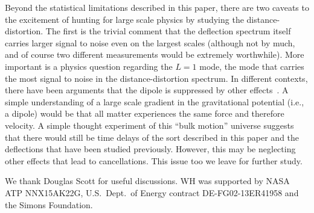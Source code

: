 \documentclass[prd,amsmath,amssymb,floatfix,superscriptaddress,nofootinbib,twocolumn]{revtex4-1}
\begin{document}
Beyond the statistical limitations described in this paper, there are two caveats to the excitement of hunting for large scale physics by studying the distance-distortion. The first is the trivial comment that the deflection spectrum itself carries larger signal to noise even on the largest scales (although not by much, and of course two different measurements would be extremely worthwhile). More important is a physics question regarding the $L=1$ mode, the mode that carries the most signal to noise in the distance-distortion spectrum. In different contexts, there have been arguments that the dipole is suppressed by other effects~\cite{Zibin:2008fe,Itoh:2009vc}. A simple understanding of a large scale gradient in the gravitational potential (i.e., a dipole) would be that all matter experiences the same force and therefore velocity. A simple thought experiment of this ``bulk motion'' universe suggests that there would still be time delays of the sort described in this paper and the deflections that have been studied previously. However, this may be neglecting other effects that lead to cancellations. This issue too we leave for further study.

\acknowledgements

We thank Douglas Scott for useful discussions.   WH was supported by NASA ATP NNX15AK22G, U.S.\ Dept.\ of Energy contract DE-FG02-13ER41958
and  the Simons Foundation.






\end{document}

